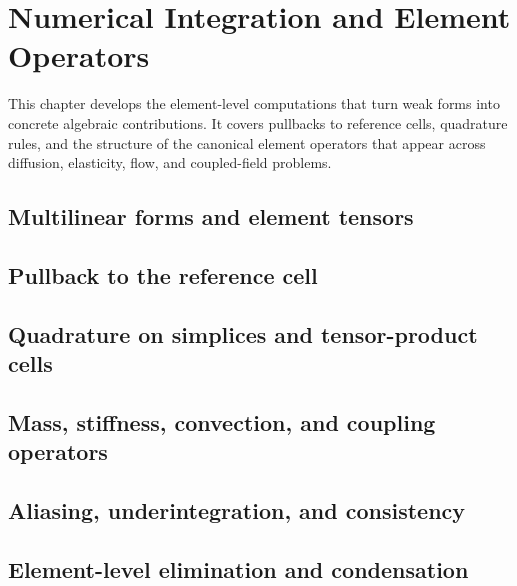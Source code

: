 \chapter{Numerical Integration and Element Operators}
\label{ch:element_operators}

This chapter develops the element-level computations that turn weak forms into
concrete algebraic contributions. It covers pullbacks to reference cells,
quadrature rules, and the structure of the canonical element operators that
appear across diffusion, elasticity, flow, and coupled-field problems.

\section{Multilinear forms and element tensors}
\label{sec:element_operators:forms}


\section{Pullback to the reference cell}
\label{sec:element_operators:pullback}


\section{Quadrature on simplices and tensor-product cells}
\label{sec:element_operators:quadrature}


\section{Mass, stiffness, convection, and coupling operators}
\label{sec:element_operators:canonical}


\section{Aliasing, underintegration, and consistency}
\label{sec:element_operators:aliasing}


\section{Element-level elimination and condensation}
\label{sec:element_operators:condensation}

